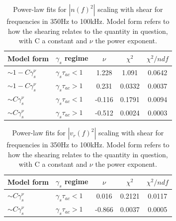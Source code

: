 \documentclass[aip,pop,amsmath,amssymb,reprint,superscriptaddress]{revtex4-1} %
\begin{document}
\begin{table}
\caption{\label{tab:table1}Power-law fits for $|n(\textit{f})^{2}|$ scaling with shear for frequencies in 350Hz to 100kHz. Model form refers to how the shearing relates to the quantity in question, with C a constant and $\nu$ the power exponent.}
\begin{ruledtabular}
\begin{tabular}{llccc}
Model form&$\gamma_{s}$ regime&$\nu$&$\chi^2$&$\chi^2/ndf$\\
\hline
$\sim 1-C\gamma_{s}^\nu$&$\gamma_{s}\tau_{ac}<1$&1.228&1.091&0.0642\\
$\sim 1-C\gamma_{s}^\nu$&$\gamma_{s}\tau_{ac}>1$&0.231&0.0332&0.0037\\
$\sim C\gamma_{s}^\nu$&$\gamma_{s}\tau_{ac}<1$&-0.116&0.1791&0.0094\\
$\sim C\gamma_{s}^\nu$&$\gamma_{s}\tau_{ac}>1$&-0.512&0.0024&0.0003\\
\end{tabular}
\end{ruledtabular}
\end{table}

\begin{table}
\caption{\label{tab:table2}Power-law fits for $|v_{r}(\textit{f})^{2}|$ scaling with shear for frequencies in 350Hz to 100kHz. Model form refers to how the shearing relates to the quantity in question, with C a constant and $\nu$ the power exponent.}
\begin{ruledtabular}
\begin{tabular}{llccc}
Model form&$\gamma_{s}$ regime&$\nu$&$\chi^2$&$\chi^2/ndf$\\
\hline
$\sim C\gamma_{s}^\nu$&$\gamma_{s}\tau_{ac}<1$&0.016&0.2121&0.0117\\
$\sim C\gamma_{s}^\nu$&$\gamma_{s}\tau_{ac}>1$&-0.866&0.0037&0.0005\\
\end{tabular}
\end{ruledtabular}
\end{table}
\end{document}
